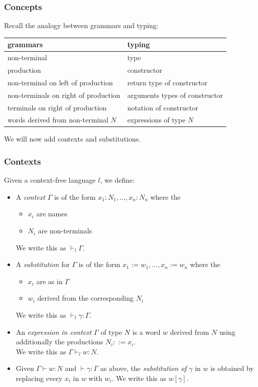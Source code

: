 \begin{frame}\frametitle{Concepts}
Recall the analogy between grammars and typing:

\begin{center}
\begin{tabular}{l|l}
grammars & typing \\
\hline
non-terminal & type \\
production & constructor \\
non-terminal on left of production & return type of constructor \\
non-terminals on right of production & arguments types of constructor \\
terminals on right of production & notation of constructor\\
words derived from non-terminal $N$ & expressions of type $N$
\end{tabular}
\end{center}

We will now add contexts and substitutions.
\end{frame}

\begin{frame}\frametitle{Contexts}
Given a context-free language $l$, we define:

\begin{itemize}
 \item A \emph{context} $\Gamma$ is of the form $x_1:N_1,\ldots,x_n:N_n$ where the
  \begin{itemize}
   \item $x_i$ are names
   \item $N_i$ are non-terminals
  \end{itemize}
  We write this as $\vdash_l \Gamma$.
 \item A \emph{substitution} for $\Gamma$ is of the form $x_1:=w_1,\ldots,x_n:=w_n$ where the
  \begin{itemize}
   \item $x_i$ are as in $\Gamma$
   \item $w_i$ derived from the corresponding $N_i$
  \end{itemize}
  We write this as $\vdash_l \gamma:\Gamma$.
 \item An \emph{expression in context} $\Gamma$ of type $N$ is a word $w$ derived from $N$ using additionally the productions $N_i::= x_i$.\\
 We write this as $\Gamma\vdash_l w:N$.
 \item Given $\Gamma\vdash w:N$ and $\vdash \gamma:\Gamma$ as above, the \emph{substitution of} $\gamma$ in $w$ is obtained by replacing every $x_i$ in $w$ with $w_i$.
 We write this as $w[\gamma]$.
\end{itemize}
\end{frame}


